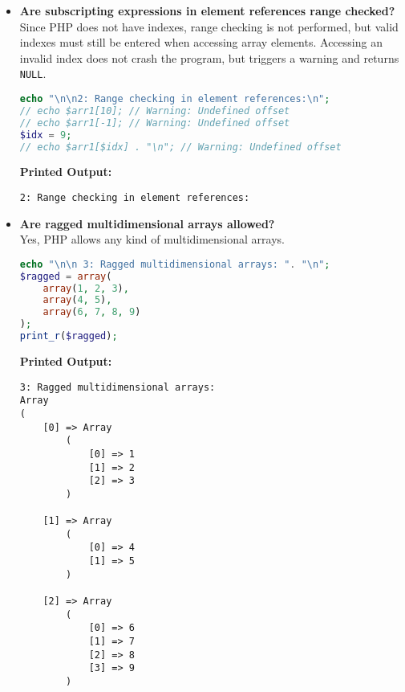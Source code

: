 \documentclass{article}
\begin{document}
\begin{itemize}
\begin{verbatim}
Warning: Undefined array key "a" in C:\Users\Msı\CS_315\Homework1\Codes\22202709_Ozongun_
HalilArda.php on line 8

4

Deprecated: Implicit conversion from float 3.8 to int loses precision in C:\Users\Msı\CS_315\
Homework1\Codes\22202709_Ozongun_HalilArda.php on line 10
4
2
Array
(
    [0] => 1
    [1] => 2
    [2] => 3
    [3] => 4
    [4] => 5
    [5] => 6
    [6] => 7
    [7] => 8
    [8] => 9
    [9] => 10
)
\end{verbatim}



\item \textbf{Are subscripting expressions in element references range checked?} \\	
Since PHP does not have indexes, range checking is not performed, but valid indexes must still be entered when accessing array elements. Accessing an invalid index does not crash the program, but triggers a warning and returns \texttt{NULL}.

\begin{lstlisting}[language=PHP]
echo "\n\n2: Range checking in element references:\n";
// echo $arr1[10]; // Warning: Undefined offset
// echo $arr1[-1]; // Warning: Undefined offset
$idx = 9;
// echo $arr1[$idx] . "\n"; // Warning: Undefined offset
\end{lstlisting}
\textbf{Printed Output:}
\begin{verbatim}
2: Range checking in element references:
\end{verbatim}



\item \textbf{Are ragged multidimensional arrays allowed?} \\
Yes, PHP allows any kind of multidimensional arrays.
\begin{lstlisting}[language=PHP]
echo "\n\n 3: Ragged multidimensional arrays: ". "\n";
$ragged = array(
    array(1, 2, 3),
    array(4, 5),
    array(6, 7, 8, 9)
);
print_r($ragged);
\end{lstlisting}
\textbf{Printed Output:}
\begin{verbatim}
3: Ragged multidimensional arrays: 
Array
(
    [0] => Array
        (
            [0] => 1
            [1] => 2
            [2] => 3
        )

    [1] => Array
        (
            [0] => 4
            [1] => 5
        )

    [2] => Array
        (
            [0] => 6
            [1] => 7
            [2] => 8
            [3] => 9
        )


\end{verbatim}
\end{itemize}
\end{document}
